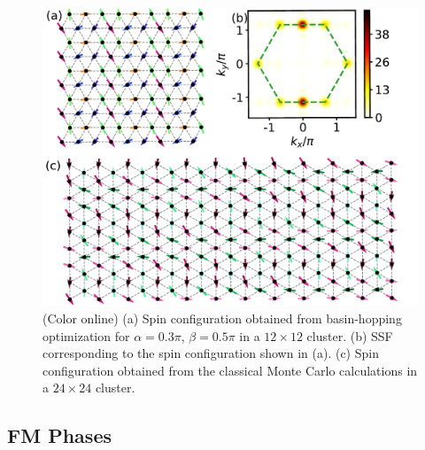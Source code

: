 \documentclass[aps,prb,reprint,amsfonts,amsmath,amssymb,showpacs,groupedaddress,superscriptaddress]{revtex4-1}
\begin{document}
\begin{figure}
    \centering
    \includegraphics[width=0.95\columnwidth]{fig/ModulatedStripe.pdf}
    \caption{\label{fig:ModulatedStripe}(Color online) (a) Spin configuration obtained from basin-hopping optimization for $\alpha=0.3\pi$, $\beta=0.5\pi$ in a $12 \times 12$ cluster. (b) SSF corresponding to the spin configuration shown in (a). (c) Spin configuration obtained from the classical Monte Carlo calculations in a $24 \times 24$ cluster.}
\end{figure}

\subsection{\label{subsec:FMPhases}FM Phases}
\end{document}
